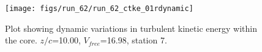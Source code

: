 \begin{figure}[H]
\centering
\texttt{[image: figs/run\_62/run\_62\_ctke\_01rdynamic]}
\caption{Plot showing dynamic variations in turbulent kinetic energy within the core. $z/c$=10.00, $V_{free}$=16.98, station 7.}
\end{figure}


